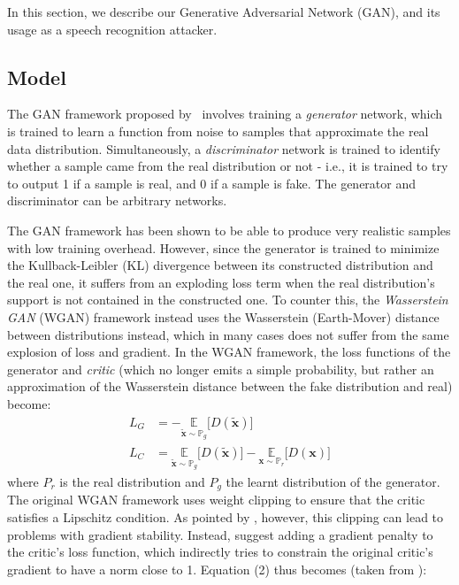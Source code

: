 In this section, we describe our Generative Adversarial Network (GAN), and its usage as a speech recognition attacker. 
\subsection{Model}
The GAN framework proposed by~\cite{goodfellow2014generative} involves training a 
\textit{generator} network, which is trained to learn a function from noise to samples that approximate the real data distribution. Simultaneously, a
\textit{discriminator} network is trained to identify whether a sample came from
the real distribution or not - i.e., it is trained to try to output 1 if a sample is real, and 0 if a sample is fake. The generator and discriminator can be arbitrary networks.

The GAN framework has been shown to be able to produce very realistic samples with low training overhead. However, since the generator is trained to minimize the Kullback-Leibler (KL) divergence between its constructed distribution and the real one, it suffers from an exploding loss term when the real distribution's support is not contained in the constructed one. To counter this, the \textit{Wasserstein GAN} \cite{arjovsky2017wasserstein} (WGAN) framework instead uses the Wasserstein (Earth-Mover) distance between distributions instead, which in many cases does not suffer from the same explosion of loss and gradient. In the WGAN framework, the loss functions of the generator and \textit{critic} (which no longer emits a simple probability, but rather an approximation of the Wasserstein distance between the fake distribution and real) become:
\begin{align}
    L_G &= -\underset{\boldsymbol{\widetilde{x}} \sim \mathbb{P}_{g}}{\mathbb{E}}  \big[D(\boldsymbol{\widetilde{x}})\big] \\
    L_C &= \underset{\boldsymbol{\widetilde{x}} \sim \mathbb{P}_{g}}{\mathbb{E}}  \big[D(\boldsymbol{\widetilde{x}})\big] - \underset{\boldsymbol{x} \sim \mathbb{P}_{r}}{\mathbb{E}}  \big[D(\boldsymbol{x})\big]
\end{align}
where $P_r$ is the real distribution and $P_g$ the learnt distribution of the generator. \\
The original WGAN framework uses weight clipping to ensure that the critic satisfies a Lipschitz condition. As pointed by \cite{gulrajani2017improved}, however, this clipping can lead to problems with gradient stability. Instead, \cite{gulrajani2017improved} suggest adding a gradient penalty to the critic's loss function, which indirectly tries to constrain the original critic's gradient to have a norm close to 1. Equation (2) thus becomes (taken from \cite{gulrajani2017improved}):
